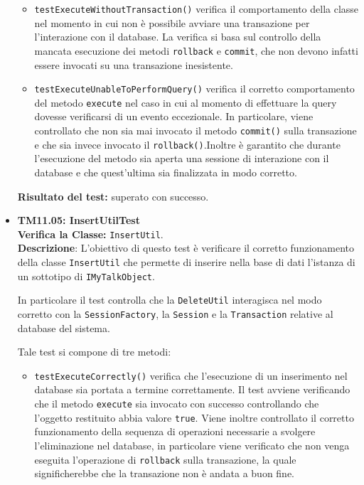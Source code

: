 \begin{itemize}
\begin{itemize}
\item \texttt{testExecuteWithoutTransaction()}
verifica il comportamento della classe nel momento in cui non è possibile avviare una transazione per l'interazione con il database.
La verifica si basa sul controllo della mancata esecuzione dei metodi \texttt{rollback} e \texttt{commit}, che non devono infatti essere invocati su una transazione inesistente.

\item \texttt{testExecuteUnableToPerformQuery()} verifica il corretto comportamento del metodo \texttt{execute} nel caso in cui al momento di effettuare la query dovesse verificarsi di un evento eccezionale. In particolare, viene controllato che non sia mai invocato il metodo \texttt{commit()} sulla transazione e che sia invece invocato il \texttt{rollback()}.Inoltre è garantito che durante l'esecuzione del metodo sia aperta una sessione di interazione con il database e che quest'ultima sia finalizzata in modo corretto. 
\end{itemize}
\textbf{Risultato del test:} superato con successo.

\item \textbf{TM11.05: InsertUtilTest}\\
\textbf{Verifica la Classe:} \texttt{InsertUtil}.\\
\textbf{Descrizione}: L'obiettivo di questo test è verificare il corretto funzionamento della classe \texttt{InsertUtil} che permette di inserire nella base di dati l'istanza di un sottotipo di \texttt{IMyTalkObject}.

In particolare il test controlla che la \texttt{DeleteUtil} interagisca nel modo corretto con la \texttt{SessionFactory}, la \texttt{Session} e la \texttt{Transaction} relative al database del sistema.

Tale test si compone di tre metodi:
\begin{itemize}
\item \texttt{testExecuteCorrectly()} 
verifica che l'esecuzione di un inserimento nel database sia portata a termine correttamente. Il test avviene verificando che il metodo \texttt{execute} sia invocato con successo controllando che l'oggetto restituito abbia valore \texttt{true}. Viene inoltre controllato il corretto funzionamento della sequenza di operazioni necessarie a svolgere l'eliminazione nel database, in particolare viene verificato che non venga eseguita l'operazione di \texttt{rollback} sulla transazione, la quale significherebbe che la transazione non è andata a buon fine.


\end{itemize}
\end{itemize}
